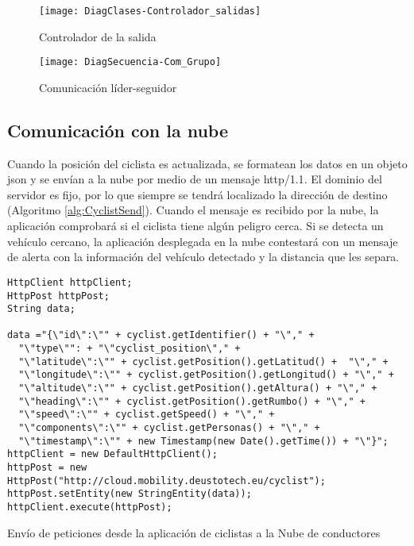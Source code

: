 \begin{figure}[H]
	\begin{center}
		\texttt{[image: DiagClases-Controlador\_salidas]}
		\caption{Controlador de la salida}
		\label{figure:DiagramController}
	\end{center}
\end{figure}

\begin{figure}[H]
	\begin{center}
		\texttt{[image: DiagSecuencia-Com\_Grupo]}
		\caption{Comunicación líder-seguidor}
		\label{figure:groupComm}
	\end{center}
\end{figure}

\subsection{Comunicación con la nube}\label{ssection:comunicacion_nube}
Cuando la posición del ciclista es actualizada, se formatean los datos en un
objeto \gls{json} y se envían a la nube por medio de un mensaje \Gls{http/1.1}.
El dominio del servidor es fijo, por lo que siempre se tendrá localizado la
dirección de destino (Algoritmo \ref{alg:CyclistSend}). Cuando el mensaje es
recibido por la nube, la aplicación comprobará si el ciclista tiene algún
peligro cerca. Si se detecta un vehículo cercano, la aplicación desplegada en
la nube contestará con un mensaje de alerta con la información del vehículo
detectado y la distancia que les separa.

\begin{listing}
	\begin{minipage}{.4\textwidth}
		\begin{verbatim}
HttpClient httpClient;
HttpPost httpPost;
String data;

data ="{\"id\":\"" + cyclist.getIdentifier() + "\"," +
  "\"type\"": + "\"cyclist_position\"," +
  "\"latitude\":\"" + cyclist.getPosition().getLatitud() +  "\"," +
  "\"longitude\":\"" + cyclist.getPosition().getLongitud() + "\"," +
  "\"altitude\":\"" + cyclist.getPosition().getAltura() + "\"," +
  "\"heading\":\"" + cyclist.getPosition().getRumbo() + "\"," +
  "\"speed\":\"" + cyclist.getSpeed() + "\"," +
  "\"components\":\"" + cyclist.getPersonas() + "\"," +
  "\"timestamp\":\"" + new Timestamp(new Date().getTime()) + "\"}";
httpClient = new DefaultHttpClient();
httpPost = new HttpPost("http://cloud.mobility.deustotech.eu/cyclist");
httpPost.setEntity(new StringEntity(data));
httpClient.execute(httpPost);
		\end{verbatim}
	\end{minipage}
	\caption{Envío de peticiones desde la aplicación de ciclistas a la Nube de
	conductores}\label{alg:CyclistSend}
\end{listing}

